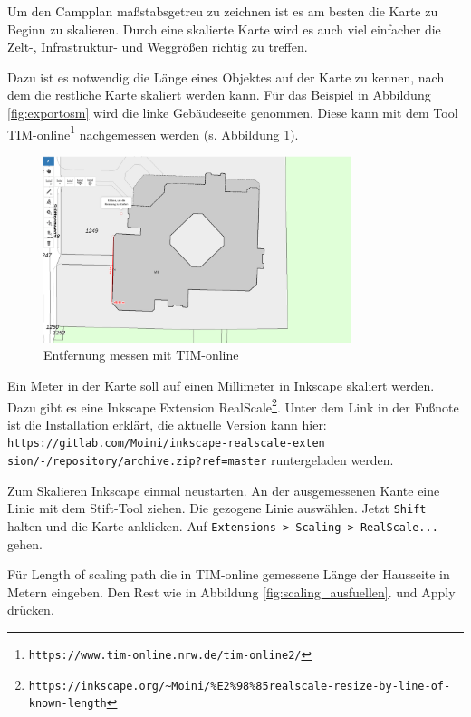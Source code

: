 \documentclass[letterpaper,12pt,
				parkskip = half]{article}
\begin{document}
Um den Campplan maßstabsgetreu zu zeichnen ist es am besten die Karte zu Beginn zu skalieren. Durch eine skalierte Karte wird es auch viel einfacher die Zelt-, Infrastruktur- und Weggrößen richtig zu treffen.

Dazu ist es notwendig die Länge eines Objektes auf der Karte zu kennen, nach dem die restliche Karte skaliert werden kann.
Für das Beispiel in Abbildung \ref{fig:exportosm} wird die linke Gebäudeseite genommen. Diese kann mit dem Tool TIM-online\footnote{\texttt{https://www.tim-online.nrw.de/tim-online2/}} nachgemessen werden (s. Abbildung \ref{fig:tim}).

\begin{figure}[!h]
\centering
\includegraphics[width=0.8\textwidth]{Images/timonline.png}
\caption{Entfernung messen mit TIM-online}
\label{fig:tim}
\end{figure}

Ein Meter in der Karte soll auf einen Millimeter in Inkscape skaliert werden. Dazu gibt es eine Inkscape Extension \flqq{}RealScale\frqq{}\footnote{\texttt{https://inkscape.org/\~{}Moini/\%E2\%98\%85realscale-resize-by-line-of-known-length}}. Unter dem Link in der Fußnote ist die Installation erklärt, die aktuelle Version kann hier: \\ \texttt{https://gitlab.com/Moini/inkscape-realscale-exten}\\ \texttt{sion/-/repository/archive.zip?ref=master} runtergeladen werden.

Zum Skalieren Inkscape einmal neustarten. An der ausgemessenen Kante eine Linie mit dem Stift-Tool ziehen. Die gezogene Linie auswählen. Jetzt \texttt{Shift} halten und die Karte anklicken. Auf \texttt{Extensions > Scaling > RealScale...} gehen. 

Für \flqq{}Length of scaling path\frqq{} die in TIM-online gemessene Länge der Hausseite in Metern eingeben.
Den Rest wie in Abbildung \ref{fig:scaling_ausfuellen}. und \flqq{}Apply\frqq{} drücken.
\end{document}
